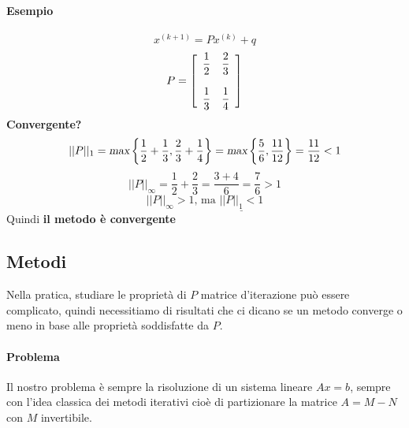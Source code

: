 \documentclass[10pt]{book}
\begin{document}
\paragraph{Esempio}
\begin{multicols}{2}
$$x^{(k+1)} = Px^{(k)} + q$$
$$P = \left[ \begin{array}{c c}
\mathlarger{\frac{1}{2}} & \mathlarger{\frac{2}{3}}\\
\\
\mathlarger{\frac{1}{3}} & \mathlarger{\frac{1}{4}}
\end{array} \right]$$
\textbf{Convergente?}
$$||P||_1 = \textsl{max}\left\{\frac{1}{2} + \frac{1}{3}, \frac{2}{3} + \frac{1}{4}\right\} = \textsl{max}\left\{\frac{5}{6}, \frac{11}{12}\right\} = \frac{11}{12} < 1$$
$$||P||_\infty = \frac{1}{2} + \frac{2}{3} = \frac{3 + 4}{6} = \frac{7}{6} > 1$$
$$||P||_\infty > 1 \text{, ma }\underline{||P||_1 < 1}$$
Quindi \textbf{il metodo è convergente}
\end{multicols}
\subsection{Metodi} Nella pratica, studiare le proprietà di $P$ matrice d'iterazione può essere complicato, quindi necessitiamo di risultati che ci dicano se un metodo converge o meno in base alle proprietà soddisfatte da $P$.
\paragraph{Problema} Il nostro problema è sempre la risoluzione di un sistema lineare $Ax = b$, sempre con l'idea classica dei metodi iterativi cioè di partizionare la matrice $A = M-N$ con $M$ invertibile.
\end{document}
